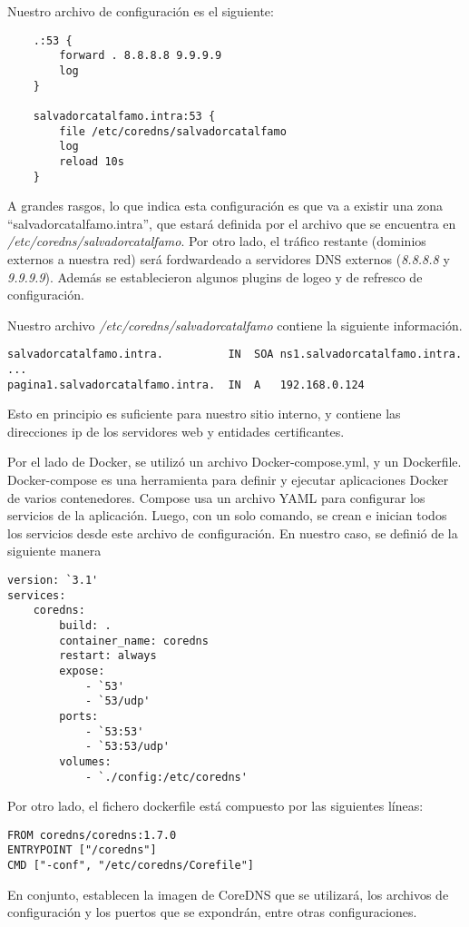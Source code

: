 \noindent Nuestro archivo de configuración es el siguiente:
\begin{verbatim}
    .:53 {
        forward . 8.8.8.8 9.9.9.9
        log
    }

    salvadorcatalfamo.intra:53 {
        file /etc/coredns/salvadorcatalfamo
        log
        reload 10s
    }    
\end{verbatim}

A grandes rasgos, lo que indica esta configuración es que va a existir una zona 
“salvadorcatalfamo.intra”, que estará definida por el archivo que se encuentra en 
\textit{/etc/coredns/salvadorcatalfamo}. Por otro lado, el tráfico restante (dominios 
externos a nuestra red) será fordwardeado a 
servidores DNS externos (\textit{8.8.8.8} y \textit{9.9.9.9}). Además se establecieron algunos plugins de logeo y 
de refresco de configuración.

Nuestro archivo \textit{/etc/coredns/salvadorcatalfamo} contiene la siguiente información.
\begin{verbatim}
salvadorcatalfamo.intra.          IN  SOA ns1.salvadorcatalfamo.intra. ...
pagina1.salvadorcatalfamo.intra.  IN  A   192.168.0.124   
\end{verbatim}

Esto en principio es suficiente para nuestro sitio interno, y contiene las direcciones ip de los 
servidores web y entidades certificantes.

Por el lado de Docker, se utilizó un archivo Docker-compose.yml, y un Dockerfile. 
Docker-compose es una herramienta para definir y ejecutar aplicaciones Docker de 
varios contenedores. Compose usa un archivo YAML para configurar los servicios de 
la aplicación. Luego, con un solo comando, se crean e inician todos los servicios 
desde este archivo de configuración. En nuestro caso, se definió de la siguiente 
manera

\begin{verbatim}
version: `3.1'
services:
    coredns:
        build: .
        container_name: coredns
        restart: always
        expose:
            - `53'
            - `53/udp'
        ports:
            - `53:53'
            - `53:53/udp'
        volumes:
            - `./config:/etc/coredns'    
\end{verbatim}

\noindent Por otro lado, el fichero dockerfile está compuesto por las siguientes líneas:
\begin{verbatim}
FROM coredns/coredns:1.7.0
ENTRYPOINT ["/coredns"]
CMD ["-conf", "/etc/coredns/Corefile"]    
\end{verbatim}

En conjunto, establecen la imagen de CoreDNS que se utilizará, los archivos de configuración y
los puertos que se expondrán, entre otras configuraciones.
